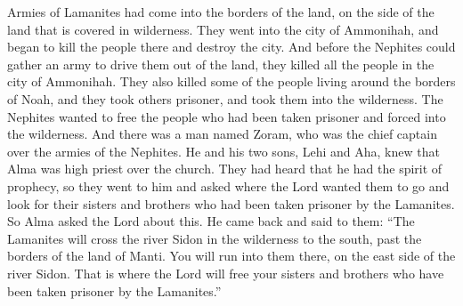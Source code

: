 Armies of Lamanites had come into the borders of the land, on the side of the land that is covered in wilderness. They went into the city of Ammonihah, and began to kill the people there and destroy the city.
\bverse \iffalse And now it came to pass, before the Nephites could raise a sufficient army to drive them out of the land, they had destroyed the people who were in the city of Ammonihah, and also some around the borders of Noah, and taken others captive into the wilderness. \fi
And before the Nephites could gather an army to drive them out of the land, they killed all the people in the city of Ammonihah. They also killed some of the people living around the borders of Noah, and they took others prisoner, and took them into the wilderness.
\bverse \iffalse Now it came to pass that the Nephites were desirous to obtain those who had been carried away captive into the wilderness. \fi
The Nephites wanted to free the people who had been taken prisoner and forced into the wilderness.
\bverse \iffalse Therefore, he that had been appointed chief captain over the armies of the Nephites, (and his name was Zoram, and he had two sons, Lehi and Aha)--now Zoram and his two sons, knowing that Alma was high priest over the church, and having heard that he had the spirit of prophecy, therefore they went unto him and desired of him to know whither the Lord would that they should go into the wilderness in search of their brethren, who had been taken captive by the Lamanites. \fi
And there was a man named Zoram, who was the chief captain over the armies of the Nephites. He and his two sons, Lehi and Aha, knew that Alma was high priest over the church. They had heard that he had the spirit of prophecy, so they went to him and asked where the Lord wanted them to go and look for their sisters and brothers who had been taken prisoner by the Lamanites.
\bverse \iffalse And it came to pass that Alma inquired of the Lord concerning the matter. And Alma returned and said unto them: Behold, the Lamanites will cross the river Sidon in the south wilderness, away up beyond the borders of the land of Manti. And behold there shall ye meet them, on the east of the river Sidon, and there the Lord will deliver unto thee thy brethren who have been taken captive by the Lamanites. \fi
So Alma asked the Lord about this. He came back and said to them: ``The Lamanites will cross the river Sidon in the wilderness to the south, past the borders of the land of Manti. You will run into them there, on the east side of the river Sidon. That is where the Lord will free your sisters and brothers who have been taken prisoner by the Lamanites.''
